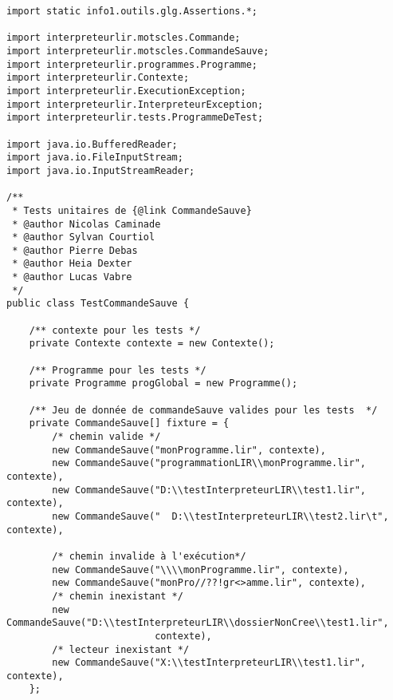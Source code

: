 \begin{enum}
\begin{verbatim}
import static info1.outils.glg.Assertions.*;

import interpreteurlir.motscles.Commande;
import interpreteurlir.motscles.CommandeSauve;
import interpreteurlir.programmes.Programme;
import interpreteurlir.Contexte;
import interpreteurlir.ExecutionException;
import interpreteurlir.InterpreteurException;
import interpreteurlir.tests.ProgrammeDeTest;

import java.io.BufferedReader;
import java.io.FileInputStream;
import java.io.InputStreamReader;

/**
 * Tests unitaires de {@link CommandeSauve}
 * @author Nicolas Caminade
 * @author Sylvan Courtiol
 * @author Pierre Debas
 * @author Heia Dexter
 * @author Lucas Vabre
 */
public class TestCommandeSauve {
    
    /** contexte pour les tests */
    private Contexte contexte = new Contexte();
    
    /** Programme pour les tests */
    private Programme progGlobal = new Programme();
    
    /** Jeu de donnée de commandeSauve valides pour les tests  */
    private CommandeSauve[] fixture = {
        /* chemin valide */
        new CommandeSauve("monProgramme.lir", contexte),
        new CommandeSauve("programmationLIR\\monProgramme.lir", contexte),
        new CommandeSauve("D:\\testInterpreteurLIR\\test1.lir", contexte),
        new CommandeSauve("  D:\\testInterpreteurLIR\\test2.lir\t", contexte),
        
        /* chemin invalide à l'exécution*/
        new CommandeSauve("\\\\monProgramme.lir", contexte),
        new CommandeSauve("monPro//??!gr<>amme.lir", contexte),
        /* chemin inexistant */
        new CommandeSauve("D:\\testInterpreteurLIR\\dossierNonCree\\test1.lir", 
                          contexte),
        /* lecteur inexistant */
        new CommandeSauve("X:\\testInterpreteurLIR\\test1.lir", contexte),    
    };


\end{verbatim}
\end{enum}
